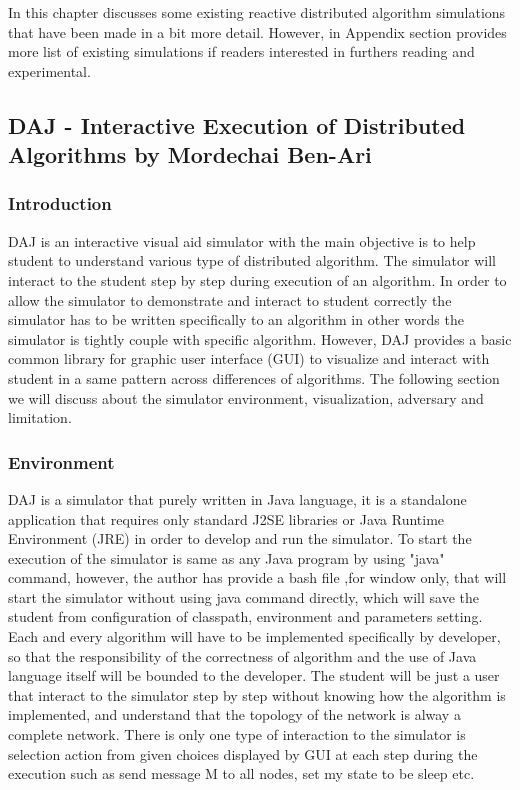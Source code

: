 
In this chapter discusses some existing reactive distributed algorithm simulations that have been made in a bit more detail. However, in Appendix section provides more list of existing simulations if readers interested in furthers reading and experimental.


\subsection{DAJ - Interactive Execution of Distributed Algorithms by Mordechai Ben-Ari}


\subsubsection{Introduction}
DAJ is an interactive visual aid simulator with the main objective is to help student to understand various type of distributed algorithm. The simulator will interact to the student step by step during execution of an algorithm. In order to allow the simulator to demonstrate and interact to student correctly the simulator has to be written specifically to an algorithm in other words the simulator is tightly couple with specific algorithm. However, DAJ provides a basic common library for graphic user interface (GUI) to visualize and interact with student in a same pattern across differences of algorithms. The following section we will discuss about the simulator environment, visualization, adversary and limitation.

\subsubsection{Environment}
DAJ is a simulator that purely written in Java language, it is a standalone application that requires only standard J2SE libraries or Java Runtime Environment (JRE) in order to develop and run the simulator. To start the execution of the simulator is same as any Java program by using "java" command, however, the author has provide a bash file ,for window only, that will start the simulator without using java command directly, which will save the student from configuration of classpath, environment and parameters setting. Each and every algorithm will have to be implemented specifically by developer, so that the responsibility of the correctness of algorithm and the use of Java language itself will be bounded to the developer. The student will be just a user that interact to the simulator step by step without knowing how the algorithm is implemented, and understand that the topology of the network is alway a complete network. There is only one type of interaction to the simulator is selection action from  given choices displayed by GUI at each step during the execution such as send message M to all nodes, set my state to be sleep etc.

